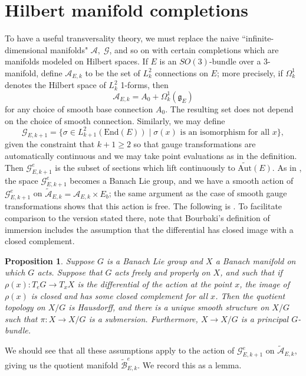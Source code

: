 \documentclass{memo-l}
\newtheorem{proposition}[theorem]{Proposition}
\theoremstyle{definition}
\theoremstyle{remark}
\numberwithin{section}{chapter}
\numberwithin{equation}{chapter}
\begin{document}
\section{Hilbert manifold completions}\label{sec:config-Hilbert-3d}
To have a useful transversality theory, we must replace the naive ``infinite-dimensional manifolds" $\mathcal A,\; \mathcal G$, and so on with certain completions which are manifolds modeled on Hilbert spaces. If $E$ is an $SO(3)$-bundle over a 3-manifold, define $\mathcal A_{E,k}$ to be the set of $L^2_k$ connections on $E$; more precisely, if $\Omega^1_k$ denotes the Hilbert space of $L^2_k$ 1-forms, then 
$$\mathcal A_{E,k} = A_0 + \Omega^1_k(\mathfrak g_E)$$
for any choice of smooth base connection $A_0$. The resulting set does not depend on the choice of smooth connection. Similarly, we may define 
$$\mathcal G_{E,k+1} = \{\sigma \in L^2_{k+1}(\text{End}(E)) \mid \sigma(x) \text{ is an isomorphism for all } x\},$$ 
given the constraint that $k+1 \geq 2$ so that gauge transformations are automatically continuous and we may take point evaluations as in the definition. Then $\mathcal G^e_{E,k+1}$ is the subset of sections which lift continuously to $\widetilde{\text{Aut}}(E)$. As in \cite[Section~4.2]{DK}, the space $\mathcal G^e_{E,k+1}$ becomes a Banach Lie group, and we have a smooth action of $\mathcal G^{e}_{E,k+1}$ on $\widetilde{\mathcal A}_{E,k} = \mathcal A_{E,k} \times E_b$; the same argument as the case of smooth gauge transformations shows that this action is free. The following is \cite[Proposition~3.1.5.10]{Bou}. To facilitate comparison to the version stated there, note that Bourbaki's definition of immersion includes the assumption that the differential has closed image with a closed complement.

\begin{proposition}Suppose $G$ is a Banach Lie group and $X$ a Banach manifold on which $G$ acts. Suppose that $G$ acts freely and properly on $X$, and such that if $\rho(x): T_eG \to T_xX$ is the differential of the action at the point $x$, the image of $\rho(x)$ is closed and has some closed complement for all $x$. Then the quotient topology on $X/G$ is Hausdorff, and there is a unique smooth structure on $X/G$ such that $\pi: X \to X/G$ is a submersion. Furthermore, $X \to X/G$ is a principal $G$-bundle.
\end{proposition}

We should see that all these assumptions apply to the action of $\mathcal G^e_{E,k+1}$ on $\widetilde{\mathcal A}_{E,k}$, giving us the quotient manifold $\widetilde{\mathcal B}^e_{E,k}$. We record this as a lemma.
\end{document}
